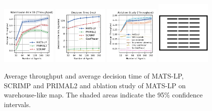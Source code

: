 \documentclass[letterpaper]{article} %
\begin{document}
\begin{figure}[t!]

    \centering
    \includegraphics[width=0.24\textwidth]{figures/05-warehouse-throughput.pdf}
    \includegraphics[width=0.24\textwidth]{figures/06-warehouse-runtime.pdf}
    \includegraphics[width=0.24\textwidth]{figures/07-warehouse-ablations.pdf}
    \hspace{10px}
    \includegraphics[width=0.24\textwidth]{figures/warehouse-map.png}
    
    \caption{Average throughput and average decision time of MATS-LP, SCRIMP and PRIMAL2 and ablation study of MATS-LP on warehouse-like map. The shaded areas indicate the 95\% confidence intervals.}
    \label{fig:warehouse}

\end{figure}
\end{document}
